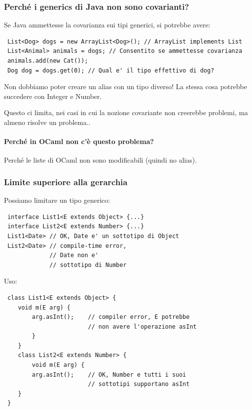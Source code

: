 \documentclass[a4paper,10pt]{article}
\begin{document}
\subsubsection{Perché i generics di Java non sono covarianti?}
\label{dogcat}
Se Java ammettesse la covarianza sui tipi generici, si potrebbe avere:

\begin{lstlisting}
 List<Dog> dogs = new ArrayList<Dog>(); // ArrayList implements List
 List<Animal> animals = dogs; // Consentito se ammettesse covarianza
 animals.add(new Cat());
 Dog dog = dogs.get(0); // Qual e' il tipo effettivo di dog?
\end{lstlisting}

Non dobbiamo poter creare un alias con un tipo diverso! La stessa cosa potrebbe succedere con Integer e Number.\smallskip

Questo ci limita, nei casi in cui la nozione covariante non creerebbe problemi, ma almeno risolve un problema..

\paragraph{Perché in OCaml non c'è questo problema?} Perché le liste di OCaml non sono modificabili (quindi no alias).

\subsubsection{Limite superiore alla gerarchia}
Possiamo limitare un tipo generico:

\begin{lstlisting}
 interface List1<E extends Object> {...}
 interface List2<E extends Number> {...}
 List1<Date> // OK, Date e' un sottotipo di Object
 List2<Date> // compile-time error,
             // Date non e'
             // sottotipo di Number
\end{lstlisting}

Uso:

\begin{lstlisting}
 class List1<E extends Object> {
    void m(E arg) {
        arg.asInt();    // compiler error, E potrebbe
                        // non avere l'operazione asInt
        }
    }
    class List2<E extends Number> {
        void m(E arg) {
        arg.asInt();    // OK, Number e tutti i suoi
                        // sottotipi supportano asInt
    }
 } 
\end{lstlisting}
\end{document}
